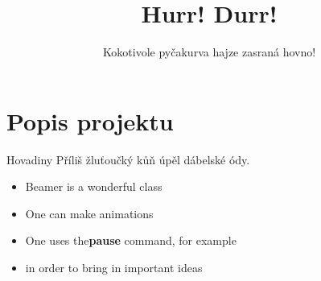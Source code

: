 \documentclass{beamer}
\title[Prezentace IFJ a IAL]{Hurr! Durr!}
\author{Kokotivole pyčakurva hajze zasraná hovno!}
\begin{document}
\begin{frame}
  \maketitle
\end{frame}
\section{Popis projektu}
\begin{frame}{Hovadiny}
  Příliš žluťoučký kůň úpěl dábelské ódy.
  \begin{itemize}
    \item Beamer is a wonderful class
    \item One can make animations
    \item One uses the\textbf{pause} command, for example
    \item in order to bring in important ideas
  \end{itemize}
\end{frame}
\end{document}
